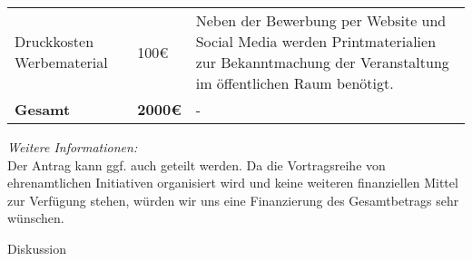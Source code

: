 {\begin{longtable}{p{3cm} p{1cm} p{11cm}}
        Druckkosten Werbematerial & 100€ & Neben der Bewerbung per Website und Social Media werden Printmaterialien zur Bekanntmachung der Veranstaltung im öffentlichen Raum benötigt.\\
        \textbf{Gesamt} & \textbf{2000€} & - \\  
    \end{longtable}
    \emph{Weitere Informationen:}\\
    Der Antrag kann ggf. auch geteilt werden. Da die Vortragsreihe von ehrenamtlichen Initiativen organisiert wird und keine weiteren finanziellen Mittel zur Verfügung stehen, würden wir uns eine Finanzierung des Gesamtbetrags sehr wünschen.\\
}{
    Diskussion
}
